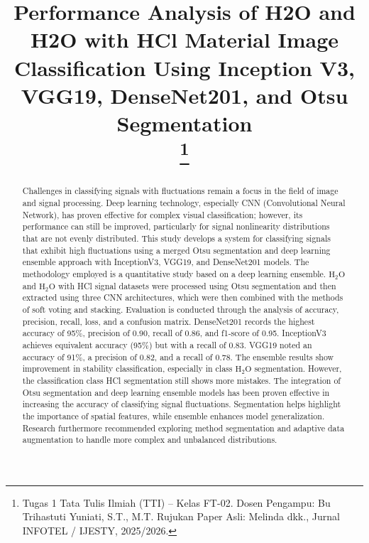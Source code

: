 \documentclass[conference]{IEEEtran}
\begin{document}
\title{Performance Analysis of H2O and H2O with HCl Material Image Classification Using Inception V3, VGG19, DenseNet201, and Otsu Segmentation\\
\thanks{Tugas 1 Tata Tulis Ilmiah (TTI) -- Kelas FT-02. Dosen Pengampu: Bu Trihastuti Yuniati, S.T., M.T. Rujukan Paper Asli: Melinda dkk., Jurnal INFOTEL / IJESTY, 2025/2026.}
}

\author{
}

\maketitle

\begin{abstract}
Challenges in classifying signals with fluctuations remain a focus in the field of image and signal processing. Deep learning technology, especially CNN (Convolutional Neural Network), has proven effective for complex visual classification; however, its performance can still be improved, particularly for signal nonlinearity distributions that are not evenly distributed. This study develops a system for classifying signals that exhibit high fluctuations using a merged Otsu segmentation and deep learning ensemble approach with InceptionV3, VGG19, and DenseNet201 models. The methodology employed is a quantitative study based on a deep learning ensemble. $\text{H}_2\text{O}$ and $\text{H}_2\text{O}$ with HCl signal datasets were processed using Otsu segmentation and then extracted using three CNN architectures, which were then combined with the methods of soft voting and stacking. Evaluation is conducted through the analysis of accuracy, precision, recall, loss, and a confusion matrix. DenseNet201 records the highest accuracy of 95\%, precision of 0.90, recall of 0.86, and f1-score of 0.95. InceptionV3 achieves equivalent accuracy (95\%) but with a recall of 0.83. VGG19 noted an accuracy of 91\%, a precision of 0.82, and a recall of 0.78. The ensemble results show improvement in stability classification, especially in class $\text{H}_2\text{O}$ segmentation. However, the classification class HCl segmentation still shows more mistakes. The integration of Otsu segmentation and deep learning ensemble models has been proven effective in increasing the accuracy of classifying signal fluctuations. Segmentation helps highlight the importance of spatial features, while ensemble enhances model generalization. Research furthermore recommended exploring method segmentation and adaptive data augmentation to handle more complex and unbalanced distributions.
\end{abstract}
\end{document}
